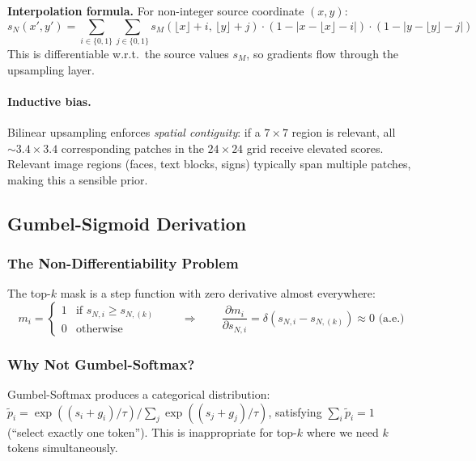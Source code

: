 \documentclass[11pt,a4paper]{article}
\begin{document}
\textbf{Interpolation formula.} For non-integer source coordinate $(x,y)$:
\begin{equation}
  s_N(x',y') = \sum_{i \in \{0,1\}} \sum_{j \in \{0,1\}}
    s_M(\lfloor x \rfloor{+}i,\, \lfloor y \rfloor{+}j)
    \cdot (1 - |x - \lfloor x \rfloor - i|)
    \cdot (1 - |y - \lfloor y \rfloor - j|)
\end{equation}
This is differentiable w.r.t.\ the source values $s_M$, so gradients
flow through the upsampling layer.

\paragraph{Inductive bias.}
Bilinear upsampling enforces \emph{spatial contiguity}: if a
$7 \times 7$ region is relevant, all $\sim\!3.4 \times 3.4$ corresponding
patches in the $24 \times 24$ grid receive elevated scores. Relevant
image regions (faces, text blocks, signs) typically span multiple patches,
making this a sensible prior.

\subsection{Gumbel-Sigmoid Derivation}
\label{subsec:gumbel_deriv}

\subsubsection{The Non-Differentiability Problem}

The top-$k$ mask is a step function with zero derivative almost everywhere:
\begin{equation}
  m_i = \begin{cases}
    1 & \text{if } s_{N,i} \geq s_{N,(k)} \\
    0 & \text{otherwise}
  \end{cases}
  \qquad \Longrightarrow \qquad
  \frac{\partial m_i}{\partial s_{N,i}} =
    \delta(s_{N,i} - s_{N,(k)}) \approx 0 \text{ (a.e.)}
\end{equation}

\subsubsection{Why Not Gumbel-Softmax?}

Gumbel-Softmax produces a categorical distribution:
$\tilde{p}_i = \exp((s_i + g_i)/\tau) / \sum_j \exp((s_j + g_j)/\tau)$,
satisfying $\sum_i \tilde{p}_i = 1$ (``select exactly one token''). This
is inappropriate for top-$k$ where we need $k$ tokens simultaneously.
\end{document}
